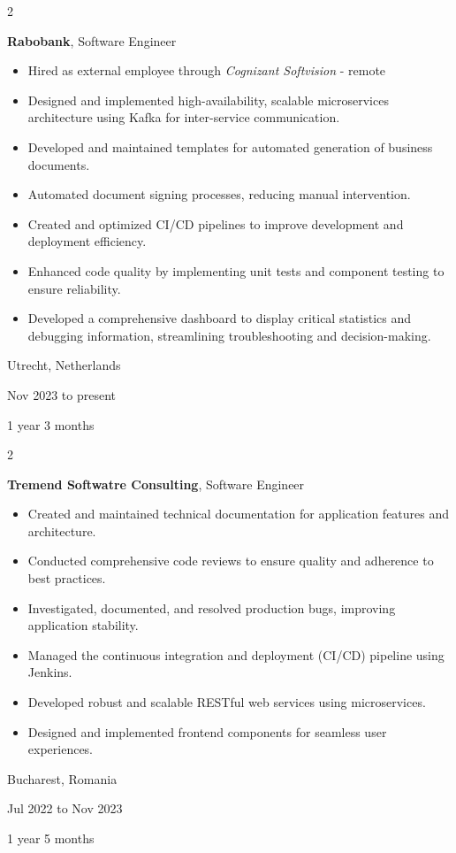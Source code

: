 \documentclass[10pt, letterpaper]{article}
\newenvironment{highlights}{
    \begin{itemize}[
        topsep=0.10 cm,
        parsep=0.10 cm,
        partopsep=0pt,
        itemsep=0pt,
        leftmargin=0.4 cm + 10pt
    ]
}{
    \end{itemize}
} %
\newenvironment{twocolentry}[2][]{
    \onecolentry
    \def\secondColumn{#2}
    \setcolumnwidth{\fill, 3.5 cm}
    \begin{paracol}{2}
}{
    \switchcolumn \raggedleft \secondColumn
    \end{paracol}
    \endonecolentry
} %
\begin{document}
        
        \begin{twocolentry}{
            Utrecht, Netherlands

        Nov 2023 to present

        1 year 3 months
        }
            \textbf{Rabobank}, Software Engineer
            \begin{highlights}
                \item Hired as external employee through \textit{Cognizant Softvision} - remote
                \item Designed and implemented high-availability, scalable microservices architecture using Kafka for inter-service communication.
                \item Developed and maintained templates for automated generation of business documents.
                \item Automated document signing processes, reducing manual intervention.
                \item Created and optimized CI/CD pipelines to improve development and deployment efficiency.
                \item Enhanced code quality by implementing unit tests and component testing to ensure reliability.
                \item Developed a comprehensive dashboard to display critical statistics and debugging information, streamlining troubleshooting and decision-making.
            \end{highlights}
        \end{twocolentry}


        \vspace{0.2 cm}

        \begin{twocolentry}{
            Bucharest, Romania

        Jul 2022 to Nov 2023

        1 year 5 months
        }
            \textbf{Tremend Softwatre Consulting}, Software Engineer
            \begin{highlights}
                \item Created and maintained technical documentation for application features and architecture.
                \item Conducted comprehensive code reviews to ensure quality and adherence to best practices.
                \item Investigated, documented, and resolved production bugs, improving application stability.
                \item Managed the continuous integration and deployment (CI/CD) pipeline using Jenkins.
                \item Developed robust and scalable RESTful web services using microservices.
                \item Designed and implemented frontend components for seamless user experiences.
            \end{highlights}
        \end{twocolentry}
\end{document}
